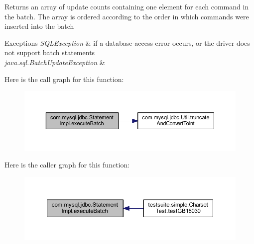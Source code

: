 \begin{DoxyReturn}{Returns}
an array of update counts containing one element for each command in the batch. The array is ordered according to the order in which commands were inserted into the batch
\end{DoxyReturn}

\begin{DoxyExceptions}{Exceptions}
{\em S\+Q\+L\+Exception} & if a database-\/access error occurs, or the driver does not support batch statements \\
\hline
{\em java.\+sql.\+Batch\+Update\+Exception} & \\
\hline
\end{DoxyExceptions}
Here is the call graph for this function\+:
\nopagebreak
\begin{figure}[H]
\begin{center}
\leavevmode
\includegraphics[width=350pt]{classcom_1_1mysql_1_1jdbc_1_1_statement_impl_acf49c07c2b02c99e25719bb916bc0b39_cgraph}
\end{center}
\end{figure}
Here is the caller graph for this function\+:
\nopagebreak
\begin{figure}[H]
\begin{center}
\leavevmode
\includegraphics[width=350pt]{classcom_1_1mysql_1_1jdbc_1_1_statement_impl_acf49c07c2b02c99e25719bb916bc0b39_icgraph}
\end{center}
\end{figure}
\mbox{\label{classcom_1_1mysql_1_1jdbc_1_1_statement_impl_a2695076e6a2e3088b8da220e7a2f89d7}} 
